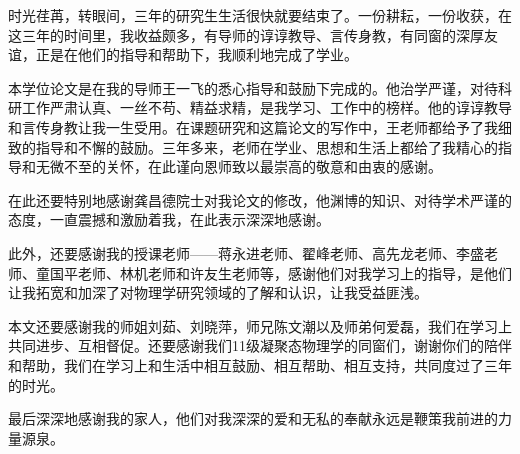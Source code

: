 \begin{thanks}

时光荏苒，转眼间，三年的研究生生活很快就要结束了。一份耕耘，一份收获，在这三年的时间里，我收益颇多，有导师的谆谆教导、言传身教，有同窗的深厚友谊，正是在他们的指导和帮助下，我顺利地完成了学业。

本学位论文是在我的导师王一飞的悉心指导和鼓励下完成的。他治学严谨，对待科研工作严肃认真、一丝不苟、精益求精，是我学习、工作中的榜样。他的谆谆教导和言传身教让我一生受用。在课题研究和这篇论文的写作中，王老师都给予了我细致的指导和不懈的鼓励。三年多来，老师在学业、思想和生活上都给了我精心的指导和无微不至的关怀，在此谨向恩师致以最崇高的敬意和由衷的感谢。

在此还要特别地感谢龚昌德院士对我论文的修改，他渊博的知识、对待学术严谨的态度，一直震撼和激励着我，在此表示深深地感谢。

此外，还要感谢我的授课老师——蒋永进老师、翟峰老师、高先龙老师、李盛老师、童国平老师、林机老师和许友生老师等，感谢他们对我学习上的指导，是他们让我拓宽和加深了对物理学研究领域的了解和认识，让我受益匪浅。

本文还要感谢我的师姐刘茹、刘晓萍，师兄陈文潮以及师弟何爱磊，我们在学习上共同进步、互相督促。还要感谢我们11级凝聚态物理学的同窗们，谢谢你们的陪伴和帮助，我们在学习上和生活中相互鼓励、相互帮助、相互支持，共同度过了三年的时光。

最后深深地感谢我的家人，他们对我深深的爱和无私的奉献永远是鞭策我前进的力量源泉。

\end{thanks}